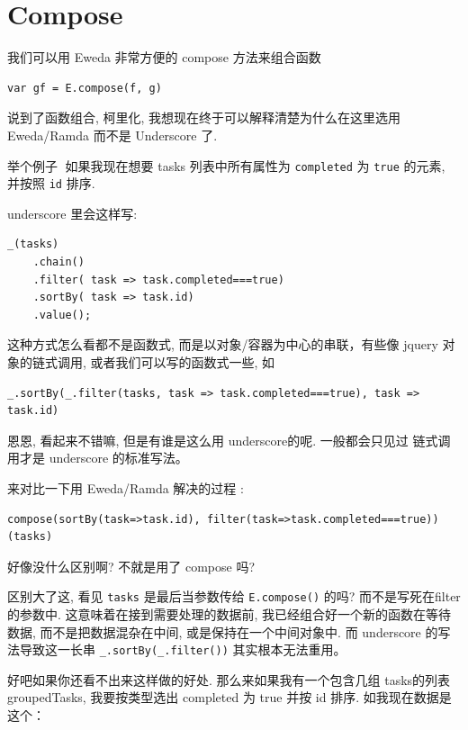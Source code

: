\documentclass[a5paper]{book}
\begin{document}
\section{Compose}
\label{sec:orgheadline20}

我们可以用 Eweda 非常方便的 compose 方法来组合函数

\begin{verbatim}
var gf = E.compose(f, g)
\end{verbatim}

说到了函数组合, 柯里化, 我想现在终于可以解释清楚为什么在这里选用
Eweda/Ramda 而不是 Underscore 了.

举个例子🌰 如果我现在想要 tasks 列表中所有属性为 \texttt{completed} 为 \texttt{true}
的元素, 并按照 \texttt{id} 排序.

underscore 里会这样写:

\begin{verbatim}
_(tasks)
    .chain()
    .filter( task => task.completed===true)
    .sortBy( task => task.id)
    .value();
\end{verbatim}

这种方式怎么看都不是函数式, 而是以对象/容器为中心的串联，有些像 jquery
对象的链式调用, 或者我们可以写的函数式一些, 如

\begin{verbatim}
_.sortBy(_.filter(tasks, task => task.completed===true), task => task.id)
\end{verbatim}

恩恩, 看起来不错嘛, 但是有谁是这么用 underscore的呢. 一般都会只见过
链式调用才是 underscore 的标准写法。

来对比一下用 Eweda/Ramda 解决的过程 :

\begin{verbatim}
compose(sortBy(task=>task.id), filter(task=>task.completed===true))(tasks)
\end{verbatim}

好像没什么区别啊? 不就是用了 compose 吗?

区别大了这, 看见 \texttt{tasks} 是最后当参数传给 \texttt{E.compose()} 的吗?
而不是写死在filter 的参数中. 这意味着在接到需要处理的数据前,
我已经组合好一个新的函数在等待数据, 而不是把数据混杂在中间,
或是保持在一个中间对象中. 而 underscore
的写法导致这一长串 \texttt{\_.sortBy(\_.filter())} 其实根本无法重用。

好吧如果你还看不出来这样做的好处. 那么来如果我有一个包含几组 tasks的列表
groupedTasks, 我要按类型选出 completed 为 true 并按 id 排序.
如我现在数据是这个：
\end{document}
